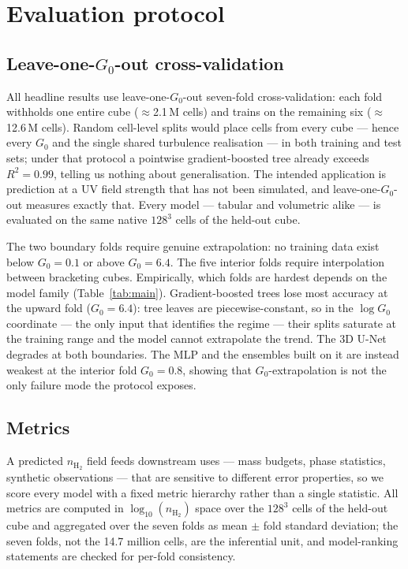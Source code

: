 \documentclass[fleqn,usenatbib]{rasti}
\newcommand{\nHH}{n_{\mathrm{H_2}}}
\newcommand{\logn}{\log_{10}(n_{\mathrm{H_2}})}
\newcommand{\Gzero}{G_0}
\newcommand{\Rsq}{R^2}
\begin{document}
\section{Evaluation protocol}
\label{sec:protocol}

\subsection{Leave-one-\texorpdfstring{\(\Gzero\)}{G0}-out cross-validation}
\label{sec:cv}

All headline results use leave-one-\(\Gzero\)-out seven-fold
cross-validation: each fold withholds one entire cube
(\(\approx\)2.1\,M cells) and trains on the remaining six
(\(\approx\)12.6\,M cells). Random cell-level splits would place cells
from every cube --- hence every \(\Gzero\) and the single shared
turbulence realisation --- in both training and test sets; under that
protocol a pointwise gradient-boosted tree already exceeds
\(\Rsq = 0.99\), telling us nothing about generalisation. The intended
application is prediction at a UV field strength that has not been
simulated, and leave-one-\(\Gzero\)-out measures exactly that. Every model
--- tabular and volumetric alike --- is evaluated on the same native
\(128^3\) cells of the held-out cube.

The two boundary folds require genuine extrapolation: no training data
exist below \(\Gzero = 0.1\) or above \(\Gzero = 6.4\). The five interior
folds require interpolation between bracketing cubes. Empirically, which
folds are hardest depends on the model family (Table~\ref{tab:main}).
Gradient-boosted trees lose most accuracy at the upward fold
(\(\Gzero = 6.4\)): tree leaves are piecewise-constant, so in the
\(\log\Gzero\) coordinate --- the only input that identifies the regime
--- their splits saturate at the training range and the model cannot
extrapolate the trend. The 3D U-Net degrades at both boundaries. The MLP
and the ensembles built on it are instead weakest at the interior fold
\(\Gzero = 0.8\), showing that \(\Gzero\)-extrapolation is not the only
failure mode the protocol exposes.

\subsection{Metrics}
\label{sec:metrics}

A predicted \(\nHH\) field feeds downstream uses --- mass budgets, phase
statistics, synthetic observations --- that are sensitive to different
error properties, so we score every model with a fixed metric hierarchy
rather than a single statistic. All metrics are computed in \(\logn\)
space over the \(128^3\) cells of the held-out cube and aggregated over
the seven folds as mean \(\pm\) fold standard deviation; the seven folds,
not the 14.7 million cells, are the inferential unit, and model-ranking
statements are checked for per-fold consistency.
\end{document}
